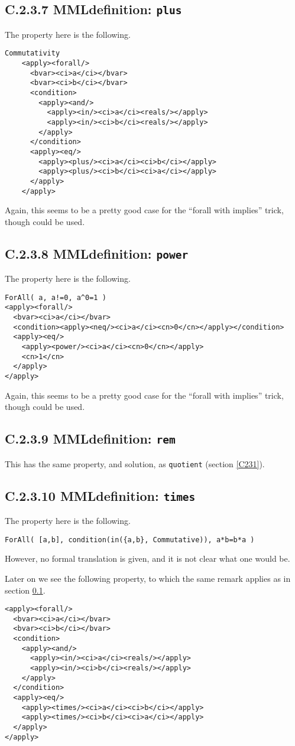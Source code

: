 \documentclass{llncs}
\begin{document}
{\subsection{C.2.3.7 MMLdefinition: {\tt plus}}\label{C237}
The property here is the following.
\begin{lstlisting}[language=MathML2]
    Commutativity 
    <apply><forall/>
      <bvar><ci>a</ci></bvar>
      <bvar><ci>b</ci></bvar>
      <condition>
        <apply><and/>
          <apply><in/><ci>a</ci><reals/></apply>
          <apply><in/><ci>b</ci><reals/></apply>
        </apply>
      </condition>
      <apply><eq/>
        <apply><plus/><ci>a</ci><ci>b</ci></apply>
        <apply><plus/><ci>b</ci><ci>a</ci></apply>
      </apply>
    </apply>
\end{lstlisting}
Again, this seems to be a pretty good case for the ``forall with implies''
trick, though {} could be used.
\subsection{C.2.3.8 MMLdefinition: {\tt power}}\label{C238}
The property here is the following.
\begin{lstlisting}[language=MathML2]
ForAll( a, a!=0, a^0=1 ) 
<apply><forall/>
  <bvar><ci>a</ci></bvar>
  <condition><apply><neq/><ci>a</ci><cn>0</cn></apply></condition>
  <apply><eq/>
    <apply><power/><ci>a</ci><cn>0</cn></apply>
    <cn>1</cn>
  </apply>
</apply>
\end{lstlisting}
Again, this seems to be a pretty good case for the ``forall with implies''
trick, though {} could be used.
\subsection{C.2.3.9 MMLdefinition: {\tt rem}}\label{C239}
This has the same property, and solution, as {\tt quotient} (section
\ref{C231}).
\subsection{C.2.3.10 MMLdefinition: {\tt times}}\label{C2310}
The property here is the following.
\begin{lstlisting} 
ForAll( [a,b], condition(in({a,b}, Commutative)), a*b=b*a )
\end{lstlisting}
However, no formal translation is given, and it is not clear what one would
be.
\par
Later on we see the following property, to which the same remark applies as in
section \ref{C237}.
\begin{lstlisting}[language=MathML2]
<apply><forall/>
  <bvar><ci>a</ci></bvar>
  <bvar><ci>b</ci></bvar>
  <condition>
    <apply><and/>
      <apply><in/><ci>a</ci><reals/></apply>
      <apply><in/><ci>b</ci><reals/></apply>
    </apply>
  </condition>
  <apply><eq/>
    <apply><times/><ci>a</ci><ci>b</ci></apply>
    <apply><times/><ci>b</ci><ci>a</ci></apply>
  </apply>
</apply> 
\end{lstlisting}
}
\end{document}
